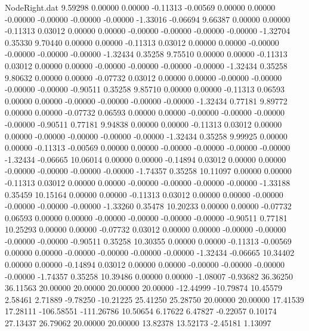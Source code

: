 \begin{filecontents}{NodeRight.dat}
   9.59298    0.00000    0.00000    -0.11313   -0.00569    0.00000    0.00000   -0.00000   -0.00000   -0.00000   -0.00000   -1.33016   -0.06694
   9.66387    0.00000    0.00000    -0.11313    0.03012    0.00000    0.00000   -0.00000   -0.00000   -0.00000   -0.00000   -1.32704    0.35330
   9.70440    0.00000    0.00000    -0.11313    0.03012    0.00000    0.00000   -0.00000   -0.00000   -0.00000   -0.00000   -1.32434    0.35258
   9.75510    0.00000    0.00000    -0.11313    0.03012    0.00000    0.00000   -0.00000   -0.00000   -0.00000   -0.00000   -1.32434    0.35258
   9.80632    0.00000    0.00000    -0.07732    0.03012    0.00000    0.00000   -0.00000   -0.00000   -0.00000   -0.00000   -0.90511    0.35258
   9.85710    0.00000    0.00000    -0.11313    0.06593    0.00000    0.00000   -0.00000   -0.00000   -0.00000   -0.00000   -1.32434    0.77181
   9.89772    0.00000    0.00000    -0.07732    0.06593    0.00000    0.00000   -0.00000   -0.00000   -0.00000   -0.00000   -0.90511    0.77181
   9.94838    0.00000    0.00000    -0.11313    0.03012    0.00000    0.00000   -0.00000   -0.00000   -0.00000   -0.00000   -1.32434    0.35258
   9.99925    0.00000    0.00000    -0.11313   -0.00569    0.00000    0.00000   -0.00000   -0.00000   -0.00000   -0.00000   -1.32434   -0.06665
  10.06014    0.00000    0.00000    -0.14894    0.03012    0.00000    0.00000   -0.00000   -0.00000   -0.00000   -0.00000   -1.74357    0.35258
  10.11097    0.00000    0.00000    -0.11313    0.03012    0.00000    0.00000   -0.00000   -0.00000   -0.00000   -0.00000   -1.33188    0.35459
  10.15164    0.00000    0.00000    -0.11313    0.03012    0.00000    0.00000   -0.00000   -0.00000   -0.00000   -0.00000   -1.33260    0.35478
  10.20233    0.00000    0.00000    -0.07732    0.06593    0.00000    0.00000   -0.00000   -0.00000   -0.00000   -0.00000   -0.90511    0.77181
  10.25293    0.00000    0.00000    -0.07732    0.03012    0.00000    0.00000   -0.00000   -0.00000   -0.00000   -0.00000   -0.90511    0.35258
  10.30355    0.00000    0.00000    -0.11313   -0.00569    0.00000    0.00000   -0.00000   -0.00000   -0.00000   -0.00000   -1.32434   -0.06665
  10.34402    0.00000    0.00000    -0.14894    0.03012    0.00000    0.00000   -0.00000   -0.00000   -0.00000   -0.00000   -1.74357    0.35258
  10.39486    0.00000    0.00000    -1.08007   -0.93682   36.36250   36.11563   20.00000   20.00000   20.00000   20.00000  -12.44999  -10.79874
  10.45579    2.58461    2.71889    -9.78250  -10.21225   25.41250   25.28750   20.00000   20.00000   17.41539   17.28111 -106.58551 -111.26786
  10.50654    6.17622    6.47827    -0.22057    0.10174   27.13437   26.79062   20.00000   20.00000   13.82378   13.52173   -2.45181    1.13097

\end{filecontents}
